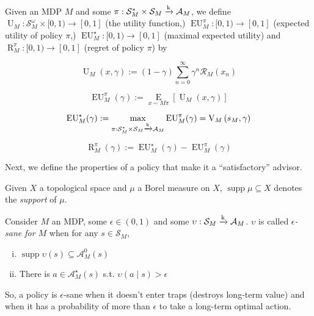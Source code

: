 \documentclass[anon,12pt]{colt2018} %
\DeclareMathOperator{\Supp}{supp}
\newcommand{\AP}[1]{\left(#1\right)}
\newcommand{\AB}[1]{\left[#1\right]}
\newcommand{\Ea}[2]{\underset{#1}{\operatorname{E}}\AB{#2}}
\newcommand{\K}{\xrightarrow{\textnormal{k}}}
\newcommand{\A}{\mathcal{A}}
\newcommand{\St}{\mathcal{S}}
\newcommand{\R}{\mathcal{R}}
\newcommand{\Ut}{\operatorname{U}}
\newcommand{\V}{\operatorname{V}}
\newcommand{\EU}{\operatorname{EU}}
\newcommand{\Rg}{\operatorname{R}}
\newcommand{\MP}[2]{#1#2}
\newcommand{\Ad}{\upsilon}
\begin{document}
\begin{samepage}
\begin{definition}
\label{def:utility}

Given an MDP $M$ and some $\pi: \St_M^* \times \St_M \K \A_M$, we define $\Ut_M: \St_M^\omega \times [0,1) \rightarrow [0,1]$ (the utility function,) $\EU_M^\pi: [0,1) \rightarrow [0,1]$ (expected utility of policy $\pi$,) $\EU_M^\star: [0,1) \rightarrow [0,1]$ (maximal expected utility) and $\Rg_M^\pi:[0,1)\rightarrow[0,1]$ (regret of policy $\pi$) by

\begin{equation}
\Ut_M(x,\gamma) := (1-\gamma)\sum_{n=0}^\infty {\gamma^n \R_M\AP{x_n}}
\end{equation}

\begin{equation}
\EU_M^\pi(\gamma) := \Ea{x\sim\MP{M}{\pi}}{\Ut_M(x,\gamma)}
\end{equation}

\begin{equation}
\EU_M^\star(\gamma):=\max_{\pi: \St_M^* \times \St_M \K \A_M} {\EU_M^\pi(\gamma)} = \V_M\AP{s_M,\gamma}
\end{equation}

\begin{equation}
\Rg_M^\pi(\gamma):=\EU_M^\star(\gamma)-\EU_M^\pi(\gamma)
\end{equation}

\end{definition}
\end{samepage}

Next, we define the properties of a policy that make it a \enquote{satisfactory} advisor.

Given $X$ a topological space and $\mu$ a Borel measure on $X$, $\Supp{\mu} \subseteq X$ denotes the \emph{support} of $\mu$.

\begin{samepage}
\begin{definition}
\label{def:sane}

Consider $M$ an MDP, some $\epsilon\in(0,1)$ and some $\Ad: \St_M \K \A_M$. $\Ad$ is called \emph{$\epsilon$-sane for $M$} when for any $s \in \St_M$,

\begin{enumerate}[i.]
\item\label{con:def__sane__safe} $\Supp{\Ad(s)} \subseteq \A_M^0\AP{s}$
\item\label{con:def__sane__bold} There is $a \in \A_M^\star(s)$ s.t. $\Ad(a \mid s) > \epsilon$
\end{enumerate}

So, a policy is $\epsilon$-sane when it doesn't enter traps (destroys long-term value) and when it has a probability of more than $\epsilon$ to take a long-term optimal action.

\end{definition}
\end{samepage}
\end{document}
